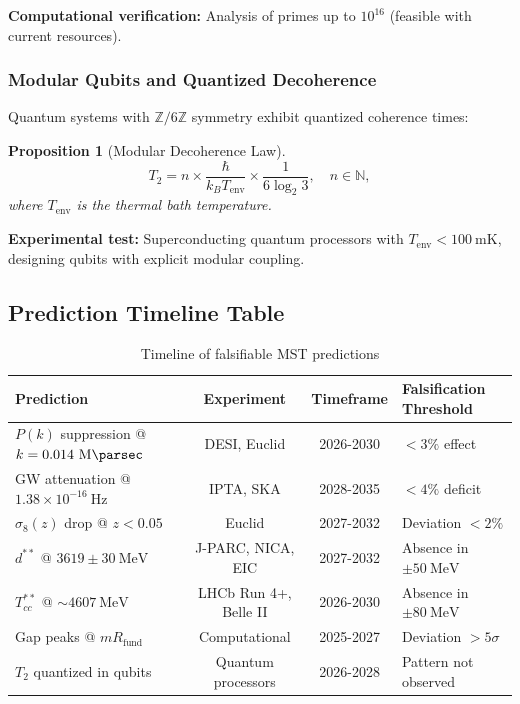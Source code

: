 \documentclass[11pt, a4paper]{article}
\theoremstyle{plain}
\newtheorem{proposition}[theorem]{Proposition}
\theoremstyle{definition}
\newcommand{\Zmod}{\mathbb{Z}/6\mathbb{Z}}
\newcommand{\Rfactor}{R_{\text{fund}}}
\begin{document}
\textbf{Computational verification:} Analysis of primes up to $10^{16}$ (feasible with current resources).

\subsubsection{Modular Qubits and Quantized Decoherence}

Quantum systems with $\Zmod$ symmetry exhibit quantized coherence times:

\begin{proposition}[Modular Decoherence Law]
\begin{equation}
T_2 = n \times \frac{\hbar}{k_B T_{\text{env}}} \times \frac{1}{6\log_2 3}, \quad n \in \mathbb{N},
\end{equation}
where $T_{\text{env}}$ is the thermal bath temperature.
\end{proposition}

\textbf{Experimental test:} Superconducting quantum processors with $T_{\text{env}} < 100\ \si{\milli\kelvin}$, designing qubits with explicit modular coupling.

\subsection{Prediction Timeline Table}

\begin{table}[H]
\centering
\caption{Timeline of falsifiable MST predictions}
\label{tab:prediction_timeline}
\begin{tabular}{p{4.5cm}ccp{4cm}}
\toprule
\textbf{Prediction} & \textbf{Experiment} & \textbf{Timeframe} & \textbf{Falsification Threshold} \\
\midrule
$P(k)$ suppression @ $k=0.014\ \si{\per\mega\parsec}$ & DESI, Euclid & 2026-2030 & $< 3\%$ effect \\
GW attenuation @ $1.38\times10^{-16}\ \si{\hertz}$ & IPTA, SKA & 2028-2035 & $< 4\%$ deficit \\
$\sigma_8(z)$ drop @ $z<0.05$ & Euclid & 2027-2032 & Deviation $< 2\%$ \\
\addlinespace
$d^{**}$ @ $3619 \pm 30\ \si{\mega\electronvolt}$ & J-PARC, NICA, EIC & 2027-2032 & Absence in $\pm 50\ \si{\mega\electronvolt}$ \\
$T_{cc}^{**}$ @ $\sim 4607\ \si{\mega\electronvolt}$ & LHCb Run 4+, Belle II & 2026-2030 & Absence in $\pm 80\ \si{\mega\electronvolt}$ \\
\addlinespace
Gap peaks @ $m\Rfactor$ & Computational & 2025-2027 & Deviation $> 5\sigma$ \\
$T_2$ quantized in qubits & Quantum processors & 2026-2028 & Pattern not observed \\
\bottomrule
\end{tabular}
\end{table}
\end{document}

